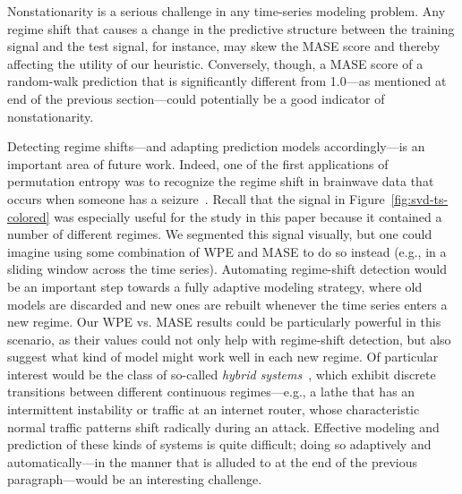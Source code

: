 \documentclass[%
pre,
reprint,
superscriptaddress,
showpacs,
nofootinbib,
nobibnotes,
 amsmath,amssymb,
 aps,
]{revtex4-1}
\begin{document}

Nonstationarity is a serious challenge in any time-series modeling
problem.  Any regime shift that causes a change in the predictive
structure between the training signal and the test signal, for
instance, may skew the MASE score and thereby affecting the utility of
our heuristic.  Conversely, though, a MASE score of a random-walk
prediction that is significantly different from 1.0---as mentioned at
end of the previous section---could potentially be a good indicator of
nonstationarity.

Detecting regime shifts---and adapting prediction models
accordingly---is an important area of future work.  Indeed, one of the
first applications of permutation entropy was to recognize the regime
shift in brainwave data that occurs when someone has a
seizure~\cite{cao2004det}.  Recall that the signal in
Figure~\ref{fig:svd-ts-colored} was especially useful for the study in
this paper because it contained a number of different regimes.  We
segmented this signal visually, but one could imagine using some
combination of WPE and MASE to do so instead (e.g., in a sliding
window across the time series).  Automating regime-shift detection
would be an important step towards a fully adaptive modeling strategy,
where old models are discarded and new ones are rebuilt whenever the
time series enters a new regime.  Our WPE vs. MASE results could be
particularly powerful in this scenario, as their values could not only
help with regime-shift detection, but also suggest what kind of model
might work well in each new regime.  Of particular interest would be
the class of so-called \emph{hybrid systems}~\cite{hybrid}, which
exhibit discrete transitions between different continuous
regimes---e.g., a lathe that has an intermittent instability or
traffic at an internet router, whose characteristic normal traffic
patterns shift radically during an attack.  Effective modeling and
prediction of these kinds of systems is quite difficult; doing so
adaptively and automatically---in the manner that is alluded to at the
end of the previous paragraph---would be an interesting challenge.
\end{document}
